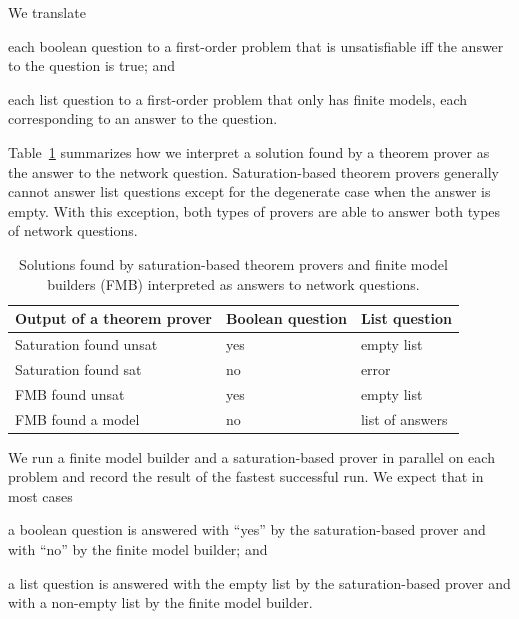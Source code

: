 We translate
\begin{enumerate*}[label=(\roman*)]
  \item each boolean question to a first-order problem that is unsatisfiable iff the answer to the question is true; and
  \item each list question to a first-order problem that only has finite models, each corresponding to an answer to the question. 
\end{enumerate*}
Table~\ref{fig:fol-answering-questions} summarizes how we interpret a solution found by a theorem prover as the answer to the network question. Saturation-based theorem provers generally cannot answer list questions except for the degenerate case when the answer is empty. With this exception, both types of provers are able to answer both types of network questions. 

\begin{table}
  \center
  \begin{tabular}{lll}
    \hline
    Output of a theorem prover & Boolean question & List question \\
    \hline
    Saturation found unsat & yes & empty list \\
    Saturation found sat   & no  & error \\
    FMB found unsat        & yes & empty list \\
    FMB found a model      & no  & list of answers \\
  \end{tabular}
  \caption{Solutions found by saturation-based theorem provers and finite model builders (FMB) interpreted as answers to network questions.}
  \label{fig:fol-answering-questions}
\end{table}


We run a finite model builder and a saturation-based prover in parallel on each problem and record the result of the fastest successful run. We expect that in most cases
\begin{enumerate*}[label=(\roman*)]
  \item a boolean question is answered with ``yes'' by the saturation-based prover and with ``no'' by the finite model builder; and
  \item a list question is answered with the empty list by the saturation-based prover and with a non-empty list by the finite model builder.
\end{enumerate*}

